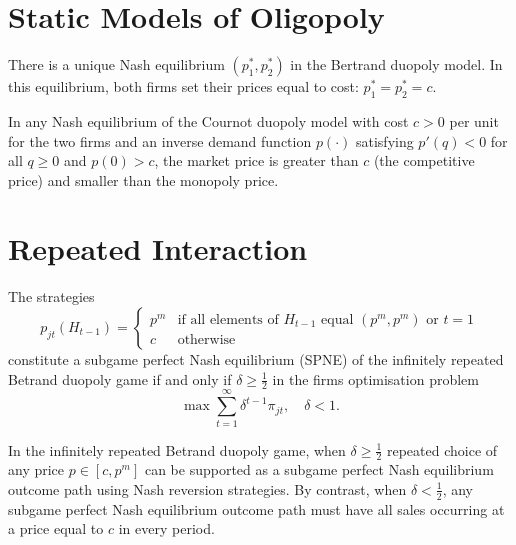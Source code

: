 \addtocounter{section}{1}

\addtocounter{section}{1}


\section{Static Models of Oligopoly}

\begin{prop}
    There is a unique Nash equilibrium $(p^*_1, p^*_2)$ in the Bertrand duopoly model. In this equilibrium, both firms set their prices equal to cost: $p^*_1 = p^*_2 = c$.
\end{prop}

\begin{prop}
    In any Nash equilibrium of the Cournot duopoly model with cost $c > 0$ per unit for the two firms and an inverse demand function $p(\cdot)$ satisfying $p'(q) < 0$ for all $q \geq 0$ and $p(0) > c$, the market price is greater than $c$ (the competitive price) and smaller than the monopoly price.
\end{prop}


\section{Repeated Interaction}

\begin{prop}
    The strategies
    \begin{equation*}
        p_{jt} (H_{t - 1}) = \begin{cases}
            p^m &\text{if all elements of $H_{t - 1}$ equal $(p^m, p^m)$ or $t = 1$} \\
            c &\text{otherwise}
        \end{cases}
    \end{equation*}
    constitute a subgame perfect Nash equilibrium (SPNE) of the infinitely repeated Betrand duopoly game if and only if $\delta \geq \frac{1}{2}$ in the firms optimisation problem
    \begin{equation*}
        \max \sum_{t = 1}^\infty \delta^{t - 1} \pi_{jt}, \quad \delta < 1.
    \end{equation*}
\end{prop}

\begin{prop}
    In the infinitely repeated Betrand duopoly game, when $\delta \geq \frac{1}{2}$ repeated choice of any price $p \in [c, p^m]$ can be supported as a subgame perfect Nash equilibrium outcome path using Nash reversion strategies. By contrast, when $\delta < \frac{1}{2}$, any subgame perfect Nash equilibrium outcome path must have all sales occurring at a price equal to $c$ in every period.
\end{prop}


